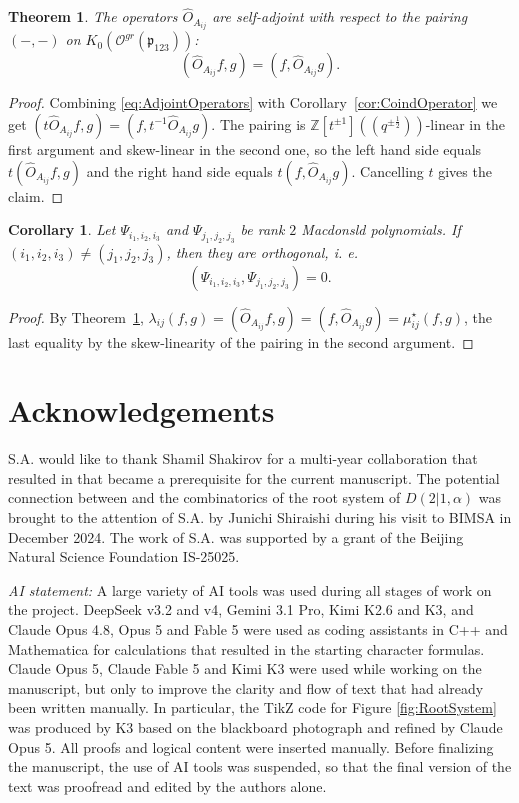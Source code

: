 \documentclass[10pt]{amsart}
\newtheorem{corollary}[theorem]{Corollary}
\newtheorem{theoremC}{Theorem}
\newcommand{\fp}{{\mathfrak p}}
\begin{document}
	\begin{theoremC}\label{thm:SelfAdjointness}
		The operators $\hat O_{A_{ij}}$ are self-adjoint with respect to the pairing $(-,-)$ on $K_0(\mathcal{O}^{gr}(\fp_{123}))$:
		\begin{equation*}
			(\hat O_{A_{ij}}f,g)=(f,\hat O_{A_{ij}}g).
		\end{equation*}
	\end{theoremC}
	\begin{proof}
		Combining \eqref{eq:AdjointOperators} with Corollary~\ref{cor:CoindOperator} we get $(t\hat O_{A_{ij}}f,g)=(f,t^{-1}\hat O_{A_{ij}}g)$. The pairing is $\mathbb{Z}[t^{\pm 1}]((q^{\pm \frac{1}{2}}))$-linear in the first argument and skew-linear in the second one, so the left hand side equals $t(\hat O_{A_{ij}}f,g)$ and the right hand side equals $t(f,\hat O_{A_{ij}}g)$. Cancelling $t$ gives the claim.
	\end{proof}
	
	\begin{corollary}\label{cor:Orthogonality}
		Let $\Psi_{i_1,i_2,i_3}$ and $\Psi_{j_1,j_2,j_3}$ be rank $2$ Macdonsld polynomials. If $(i_1,i_2,i_3) \neq (j_1,j_2,j_3)$, then they are orthogonal, i. e. 
        \[(\Psi_{i_1,i_2,i_3},\Psi_{j_1,j_2,j_3})=0.\]
	\end{corollary}
	\begin{proof}
		By Theorem~\ref{thm:SelfAdjointness}, $\lambda_{ij}(f,g)=(\hat O_{A_{ij}}f,g)=(f,\hat O_{A_{ij}}g)=\mu_{ij}^{\star}(f,g)$, the last equality by the skew-linearity of the pairing in the second argument.
	\end{proof}
	
    \section*{Acknowledgements}
    S.A. would like to thank Shamil Shakirov for a multi-year collaboration that resulted in \cite{ArthamonovShakirov-2019} that became a prerequisite for the current manuscript. The potential connection between \cite{ArthamonovShakirov-2019} and the combinatorics of the root system of $D(2|1,\alpha)$ was brought to the attention of S.A. by Junichi Shiraishi during his visit to BIMSA in December 2024. The work of S.A. was supported by a grant of the Beijing Natural Science Foundation IS-25025.
    
    \textit{AI statement:} A large variety of AI tools was used during all stages of work on the project. DeepSeek v3.2 and v4, Gemini 3.1 Pro, Kimi K2.6 and K3, and Claude Opus 4.8, Opus 5 and Fable 5 were used as coding assistants in C++ and Mathematica for calculations that resulted in the starting character formulas. Claude Opus 5, Claude Fable 5 and Kimi K3 were used while working on the manuscript, but only to improve the clarity and flow of text that had already been written manually. In particular, the TikZ code for Figure \ref{fig:RootSystem} was produced by K3 based on the blackboard photograph and refined by Claude Opus 5. All proofs and logical content were inserted manually. Before finalizing the manuscript, the use of AI tools was suspended, so that the final version of the text was proofread and edited by the authors alone.
    
	\printbibliography
	
\end{document}
